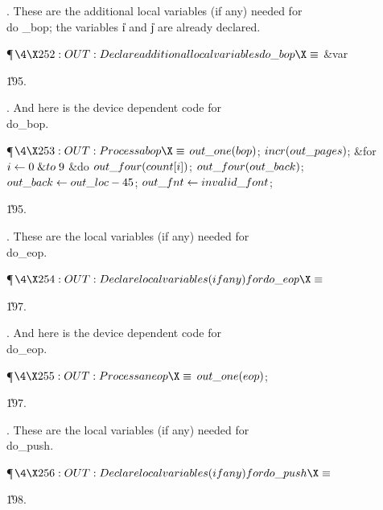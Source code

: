 . These are the additional local variables (if any) needed for \\{do%
\_bop};
the variables \|i and \|j are already declared.

\Y\P$\4\X252:OUT: Declare additional local variables \\{do\_bop}\X\S$\6
\4\&{var} \par
\U195.\fi

. And here is the device dependent code for \\{do\_bop}.

\Y\P$\4\X253:OUT: Process a \\{bop}\X\S$\6
$\\{out\_one}(\\{bop})$;\5
$\\{incr}(\\{out\_pages})$;\6
\&{for} $\|i\K0\mathrel{\&{to}}9$ \1\&{do}\5
$\\{out\_four}(\\{count}[\|i])$;\2\6
$\\{out\_four}(\\{out\_back})$;\5
$\\{out\_back}\K\\{out\_loc}-45$;\5
$\\{out\_fnt}\K\\{invalid\_font}$;\par
\U195.\fi

. These are the local variables (if any) needed for \\{do\_eop}.

\Y\P$\4\X254:OUT: Declare local variables (if any) for \\{do\_eop}\X\S$\par
\U197.\fi

. And here is the device dependent code for \\{do\_eop}.

\Y\P$\4\X255:OUT: Process an \\{eop}\X\S$\6
$\\{out\_one}(\\{eop})$;\par
\U197.\fi

. These are the local variables (if any) needed for \\{do\_push}.

\Y\P$\4\X256:OUT: Declare local variables (if any) for \\{do\_push}\X\S$\par
\U198.\fi

